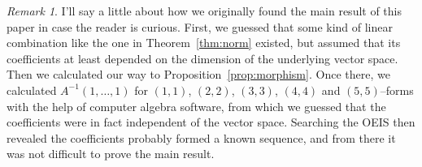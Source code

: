 \documentclass[11pt,a4paper]{amsart}
\theoremstyle{definition}
\theoremstyle{remark}
\newtheorem*{rema}{Remark}
\numberwithin{equation}{section}
\begin{document}
\begin{rema}
I'll say a little about how we originally found the main result of this
paper in case the reader is curious. First, we guessed that some kind of
linear combination like the one in Theorem~\ref{thm:norm} existed, but
assumed that its coefficients at least depended on the dimension of the
underlying vector space. Then we calculated our way to
Proposition~\ref{prop:morphism}. Once there, we calculated
$A^{-1}(1,\ldots,1)$ for $(1,1)$, $(2,2)$, $(3,3)$, $(4,4)$ and
$(5,5)$--forms with the help of computer algebra software, from which we
guessed that the coefficients were in fact independent of the vector space.
Searching the OEIS then revealed the coefficients probably formed a known
sequence, and from there it was not difficult to prove the main result.  
\end{rema}
\end{document}
